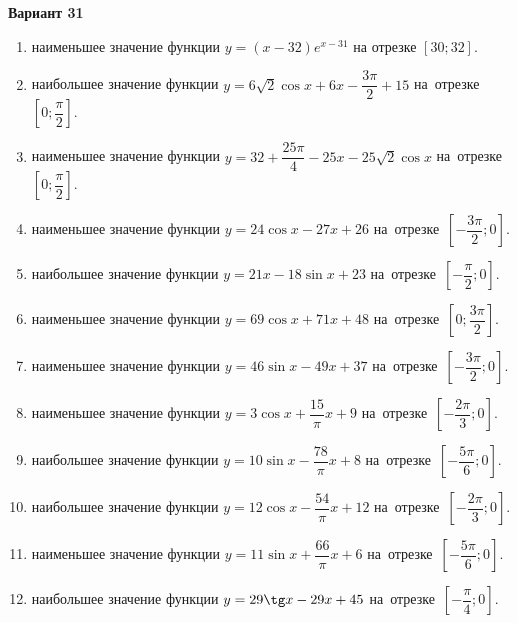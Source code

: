 \documentclass[a4paper,10pt]{article}
\begin{document}
\begin{center}\Large\textbf{Вариант 31}\end{center}

\begin{enumerate}
\item {} наименьшее значение функции $y = \left(x-32\right)e^{x-31}$ на отрезке $\left[30;32\right]$.

\item {} наибольшее значение функции $y = 6\sqrt{2}\cos x+6x-\dfrac{3\pi}{2} +15$ на~отрезке~$\left[0;\dfrac{\pi }{2}\right]$.

\item {} наименьшее значение функции $y = 32+\dfrac{25 \pi}{4}-25x-25\sqrt{2}\cos x$ на~отрезке~$\left[0;\dfrac{\pi }{2}\right]$.

\item {} наименьшее значение функции $y = 24\cos x-27x+26$ на~отрезке~$\left[-\dfrac{3\pi }{2};0\right]$.

\item {} наибольшее значение функции $y = 21x-18\sin x+23$ на~отрезке~$\left[-\dfrac{\pi }{2};0\right]$.

\item {} наименьшее значение функции $y = 69\cos x+71x+48$ на~отрезке~$\left[0;\dfrac{3\pi }{2}\right]$.

\item {} наименьшее значение функции $y = 46\sin x-49x+37$ на~отрезке~$\left[-\dfrac{3\pi }{2};0\right]$.

\item {} наименьшее значение функции $y = 3\cos x+\dfrac{15}{\pi }x +9$ на~отрезке~$\left[-\dfrac{2\pi }{3};0\right]$.

\item {} наибольшее значение функции $y = 10\sin x-\dfrac{78}{\pi }x+8$ на~отрезке~$\left[-\dfrac{5\pi }{6};0\right]$.

\item {} наибольшее значение функции $y = 12\cos x-\dfrac{54}{\pi }x+12$ на~отрезке~$\left[-\dfrac{2\pi }{3};0\right]$.

\item {} наименьшее значение функции $y = 11\sin x+\dfrac{66}{\pi }x+6$ на~отрезке~$\left[-\dfrac{5\pi }{6};0\right]$.

\item {} наибольшее значение функции $y = 29\tg x-29x+45$ на~отрезке~$\left[-\dfrac{\pi }{4};0\right]$.


\end{enumerate}
\end{document}
